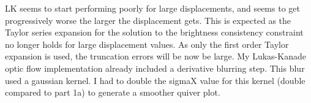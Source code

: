 LK seems to start performing poorly for large displacements, and seems to get progressively worse the larger the displacement gets. This is expected as the Taylor series expansion for the solution to the brightness consistency constraint no longer holds for large displacement values. As only the first order Taylor expansion is used, the  truncation errors will be now be large. My Lukas-Kanade optic flow implementation already included a derivative blurring step. This blur used a gaussian kernel. I had to double the sigmaX value for this kernel (double compared to part 1a) to generate a smoother quiver plot.